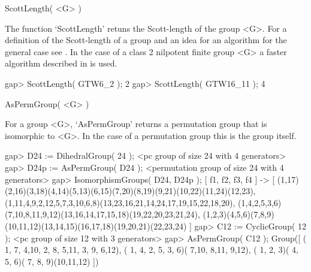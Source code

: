 

\>ScottLength( <G> )

The function `ScottLength' retuns the Scott-length of the group <G>.
For a definition of the Scott-length of a group and an idea for an
algorithm for the general case see \cite{scott69:TAOPMOAGATSOCPPGI}.
In the case of a class 2 nilpotent finite group <G> a faster algorithm
described in \cite{ecker98:OTNOPFONGOC2} is used.

\beginexample
    gap> ScottLength( GTW6_2 );    
    2
    gap> ScottLength( GTW16_11 );
    4
\endexample



\>AsPermGroup( <G> )

For a group <G>, `AsPermGroup' returns a permutation group that is isomorphic
to <G>. In the case of a permutation group this is the group itself.

\beginexample
    gap> D24 := DihedralGroup( 24 );
    <pc group of size 24 with 4 generators>
    gap> D24p := AsPermGroup( D24 );
    <permutation group of size 24 with 4 generators>
    gap> IsomorphismGroups( D24, D24p );
    [ f1, f2, f3, f4 ] ->
    [ (1,17)(2,16)(3,18)(4,14)(5,13)(6,15)(7,20)(8,19)(9,21)(10,22)(11,24)(12,23),
      (1,11,4,9,2,12,5,7,3,10,6,8)(13,23,16,21,14,24,17,19,15,22,18,20),
      (1,4,2,5,3,6)(7,10,8,11,9,12)(13,16,14,17,15,18)(19,22,20,23,21,24),
      (1,2,3)(4,5,6)(7,8,9)(10,11,12)(13,14,15)(16,17,18)(19,20,21)(22,23,24) ]
    gap> C12 := CyclicGroup( 12 );  
    <pc group of size 12 with 3 generators>
    gap> AsPermGroup( C12 );
    Group([ ( 1, 7, 4,10, 2, 8, 5,11, 3, 9, 6,12), 
      ( 1, 4, 2, 5, 3, 6)( 7,10, 8,11, 9,12), 
      ( 1, 2, 3)( 4, 5, 6)( 7, 8, 9)(10,11,12) ])
\endexample




















